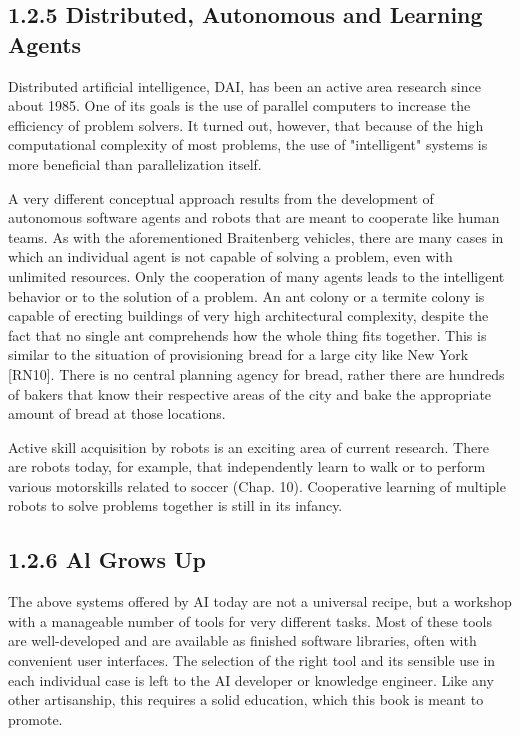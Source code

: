 \documentclass[10pt]{article}
\begin{document}
\subsection*{1.2.5 Distributed, Autonomous and Learning Agents}
Distributed artificial intelligence, DAI, has been an active area research since about 1985. One of its goals is the use of parallel computers to increase the efficiency of problem solvers. It turned out, however, that because of the high computational complexity of most problems, the use of "intelligent" systems is more beneficial than parallelization itself.

A very different conceptual approach results from the development of autonomous software agents and robots that are meant to cooperate like human teams. As with the aforementioned Braitenberg vehicles, there are many cases in which an individual agent is not capable of solving a problem, even with unlimited resources. Only the cooperation of many agents leads to the intelligent behavior or to the solution of a problem. An ant colony or a termite colony is capable of erecting buildings of very high architectural complexity, despite the fact that no single ant comprehends how the whole thing fits together. This is similar to the situation of provisioning bread for a large city like New York [RN10]. There is no central planning agency for bread, rather there are hundreds of bakers that know their respective areas of the city and bake the appropriate amount of bread at those locations.

Active skill acquisition by robots is an exciting area of current research. There are robots today, for example, that independently learn to walk or to perform\\
various motorskills related to soccer (Chap. 10). Cooperative learning of multiple robots to solve problems together is still in its infancy.

\subsection*{1.2.6 Al Grows Up}
The above systems offered by AI today are not a universal recipe, but a workshop with a manageable number of tools for very different tasks. Most of these tools are well-developed and are available as finished software libraries, often with convenient user interfaces. The selection of the right tool and its sensible use in each individual case is left to the AI developer or knowledge engineer. Like any other artisanship, this requires a solid education, which this book is meant to promote.
\end{document}
